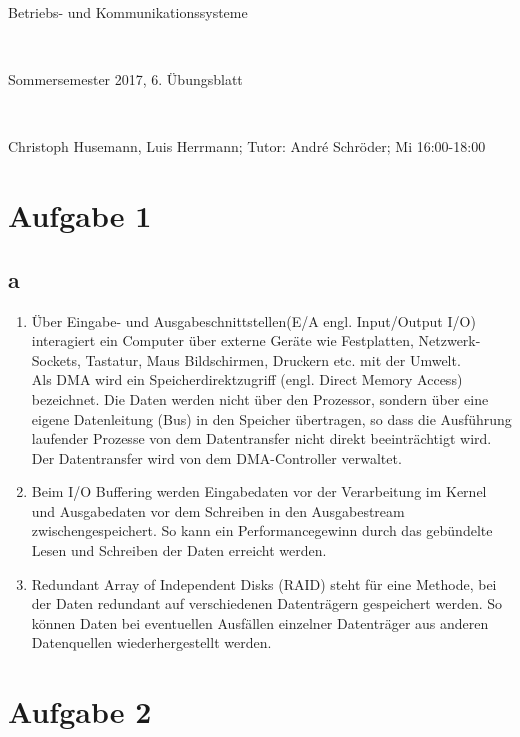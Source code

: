 \documentclass[numbers=noendperiod]{scrartcl}
\begin{document}
	
	\newcommand{\inputmintedframed}[2]{
		\begin{mdframed}[linecolor=bg,backgroundcolor=bg]
			\inputminted[mathescape,breaklines,linenos,numbersep=5pt,tabsize=3]{#1}{#2}
	\end{mdframed}}
	
	\hrulefill
	\begin{center}
		\bfseries %
		\sffamily %
		\begin{huge}
			Betriebs- und Kommunikationssysteme
		\end{huge}\\
		\begin{Large}
			Sommersemester 2017, 6. Übungsblatt
		\end{Large}\\
		\begin{small}
			Christoph Husemann, Luis Herrmann; Tutor: André Schröder; Mi 16:00-18:00
		\end{small}
		
		\vspace{-10pt}
	\end{center}
	\hrulefill
	
\section*{Aufgabe 1}
\subsection*{a}
\begin{enumerate}
	\item Über Eingabe- und Ausgabeschnittstellen(E/A engl. Input/Output I/O) interagiert ein Computer über externe Geräte wie Festplatten, Netzwerk-Sockets, Tastatur, Maus Bildschirmen, Druckern etc. mit der Umwelt.\\
	Als DMA wird ein Speicherdirektzugriff (engl. Direct Memory Access) bezeichnet. Die Daten werden nicht über den Prozessor, sondern über eine eigene Datenleitung (Bus) in den Speicher übertragen, so dass die Ausführung laufender Prozesse von dem Datentransfer nicht direkt beeinträchtigt wird. Der Datentransfer wird von dem DMA-Controller verwaltet.
	\item Beim I/O Buffering werden Eingabedaten vor der Verarbeitung im Kernel und Ausgabedaten vor dem Schreiben in den Ausgabestream zwischengespeichert. So kann ein Performancegewinn durch das gebündelte Lesen und Schreiben der Daten erreicht werden.  
	\item Redundant Array of Independent Disks (RAID) steht für eine Methode, bei der Daten redundant auf verschiedenen Datenträgern gespeichert werden. So können Daten bei eventuellen Ausfällen einzelner Datenträger aus anderen Datenquellen wiederhergestellt werden. 
	    
\end{enumerate}
\section*{Aufgabe 2}


\inputmintedframed{c}{my_lsN.c}
\end{document}
